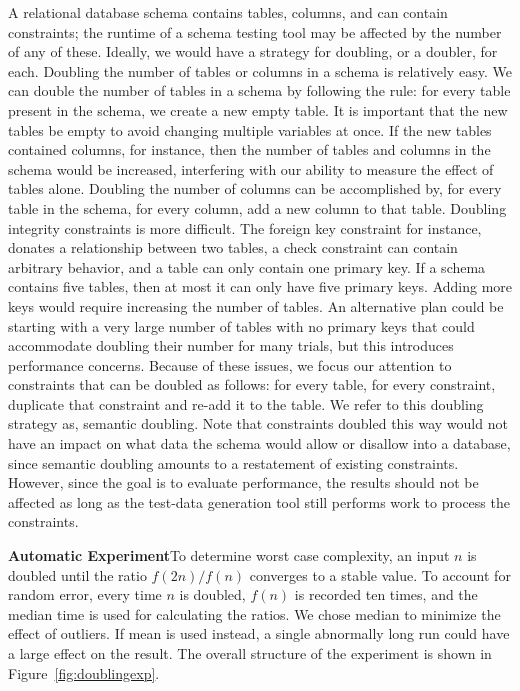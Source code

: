   A relational database schema contains tables, columns, and can contain
  constraints; the runtime of a schema testing tool may be affected by the
  number of any of these. Ideally, we would have a strategy for doubling,
  or a doubler, for each. Doubling the number of tables or columns in a
  schema is relatively easy.  We can double the number of tables in a schema
  by following the rule: for every table present in the schema, we create
  a new empty table. It is important that the new tables be empty to avoid
  changing multiple variables at once.  If the new tables contained
  columns, for instance, then the number of tables and columns in the schema
  would be increased, interfering with our ability to measure the effect of
  tables alone.  Doubling the number of columns can be accomplished by, for
  every table in the schema, for every column, add a new column to that table.
  Doubling integrity constraints is more difficult.  The foreign key
  constraint for instance, donates a relationship between two tables, a check
  constraint can contain arbitrary behavior, and a table can only contain one
  primary key.  If a schema contains five tables, then at most it can only
  have five primary keys.  Adding more keys would require increasing the
  number of tables.  An alternative plan could be starting with a very large
  number of tables with no primary keys that could accommodate doubling their
  number for many trials, but this introduces performance concerns.  Because
  of these issues, we focus our attention to constraints that can be doubled
  as follows: for every table, for every constraint, duplicate that
  constraint and re-add it to the table.  We refer to this doubling strategy
  as, semantic doubling.  Note that constraints doubled this way would not have
  an impact on what data the schema would allow or disallow into a database,
  since semantic doubling amounts to a restatement of existing constraints.
  However, since the goal is to evaluate performance, the results should not be
  affected as long as the test-data generation tool still performs work to
  process the constraints.


  \textbf{Automatic Experiment}To determine worst case complexity, an input
  $n$ is doubled until the ratio $f(2n) / f(n)$ converges to a stable value.
  To account for random error, every time $n$ is doubled, $f(n)$ is recorded
  ten times, and the median time is used for calculating the ratios.  We chose
  median to minimize the effect of outliers. If mean is used instead, a
  single abnormally long run could have a large effect on the result. The
  overall structure of the experiment is shown in Figure~\ref{fig:doublingexp}.

